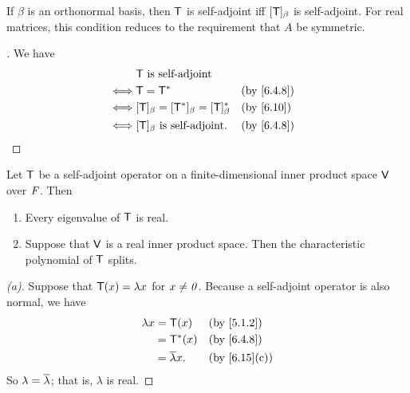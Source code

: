 \begin{cor}\label{6.4.9}
  If \(\beta\) is an orthonormal basis, then \(\mathsf{T}\) is self-adjoint iff \([\mathsf{T}]_{\beta}\) is self-adjoint.
  For real matrices, this condition reduces to the requirement that \(A\) be symmetric.
\end{cor}

\begin{proof}[]
  We have
  \begin{align*}
         & \T \text{ is self-adjoint}                                     \\
    \iff & \T = \T^*                                      &  & \by{6.4.8} \\
    \iff & [\T]_{\beta} = [\T^*]_{\beta} = [\T]_{\beta}^* &  & \by{6.10}  \\
    \iff & [\T]_{\beta} \text{ is self-adjoint}.          &  & \by{6.4.8}
  \end{align*}
\end{proof}

\begin{lem}\label{6.4.10}
  Let \(\mathsf{T}\) be a self-adjoint operator on a finite-dimensional inner product space \(\mathsf{V}\) over \(\mathit{F}\).
  Then
  \begin{enumerate}
    \item Every eigenvalue of \(\mathsf{T}\) is real.
    \item Suppose that \(\mathsf{V}\) is a real inner product space.
          Then the characteristic polynomial of \(\mathsf{T}\) splits.
  \end{enumerate}
\end{lem}

\begin{proof}[(a)]
  Suppose that \(\mathsf{T}(x) = \lambda x\) for \(x \neq \mathit{0}\).
  Because a self-adjoint operator is also normal, we have
  \begin{align*}
    \lambda x & = \T(x)             &  & \by{5.1.2}   \\
              & = \T^*(x)           &  & \by{6.4.8}   \\
              & = \conj{\lambda} x. &  & \by{6.15}[c]
  \end{align*}
  So \(\lambda = \overline{\lambda}\);
  that is, \(\lambda\) is real.
\end{proof}

